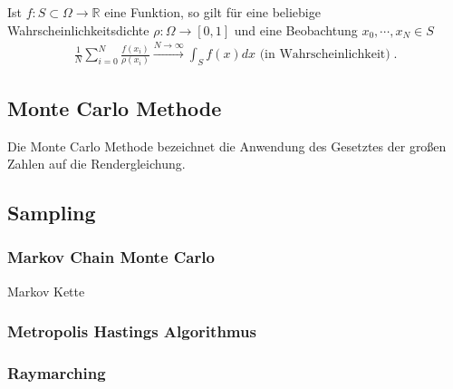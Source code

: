 \begin{Satz}
Ist $f: S \subset \Omega \to \mathbb{R}$ eine Funktion, so gilt für eine beliebige Wahrscheinlichkeitsdichte  $\rho: \Omega \to [0,1]$ und eine Beobachtung 
$x_0, \cdots ,x_N \in S$
\begin{align}
\frac{1}{N} \sum_{i= 0}^{N}  \frac{f(x_i)}{\rho(x_i)} \xrightarrow{ N \to \infty } \int_{S} f(x) dx \text{ (in Wahrscheinlichkeit)} \; .
\end{align}
\end{Satz}


\begin{figure}[H]\centering
    \hspace*{0.1\textwidth}
\end{figure}


\subsection{Monte Carlo Methode}
Die Monte Carlo Methode bezeichnet die Anwendung des  Gesetztes der großen Zahlen auf die Rendergleichung.

\subsection{Sampling}
\subsubsection{Markov Chain Monte Carlo}

\begin{Definition}{Markov Kette}
\end{Definition}

\subsubsection{Metropolis Hastings Algorithmus}
\subsubsection{Raymarching}
